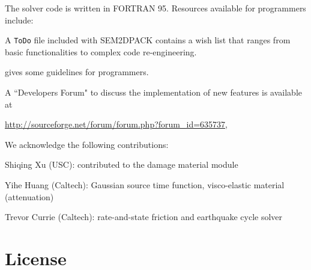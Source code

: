 The solver code is written in FORTRAN 95.
Resources available for programmers include:
\begin{sitemize}
  \item A \texttt{ToDo} file included with SEM2DPACK
contains a wish list that ranges from basic functionalities to complex code re-engineering.
  \item {} gives some guidelines for programmers.
  \item A ``Developers Forum" to discuss the implementation of new features is available at \\
\centerline{\url{http://sourceforge.net/forum/forum.php?forum_id=635737},}
\end{sitemize}

We acknowledge the following contributions:
\begin{sitemize}
  \item Shiqing Xu (USC): contributed to the damage material module
  \item Yihe Huang (Caltech): Gaussian source time function, visco-elastic material (attenuation)
  \item Trevor Currie (Caltech): rate-and-state friction and earthquake cycle solver 
\end{sitemize}

\section{License}

